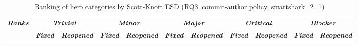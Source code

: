 \begin{table}[htbp]
    \centering
    \scriptsize
    \caption{Ranking of hero categories by Scott-Knott ESD (RQ3, commit-author policy, smartshark\_2\_1)}
    \label{tab:rq3-herorank-commit-author}
    \begin{adjustbox}{max width=\textwidth}
        \begin{tabular}{|c|cc|cc|cc|cc|cc|}
            \hline
            \multirow{2}{*}{\textit{\textbf{Ranks}}} & \multicolumn{2}{c|}{\textit{\textbf{Trivial}}} & \multicolumn{2}{c|}{\textit{\textbf{Minor}}} & \multicolumn{2}{c|}{\textit{\textbf{Major}}} & \multicolumn{2}{c|}{\textit{\textbf{Critical}}} & \multicolumn{2}{c|}{\textit{\textbf{Blocker}}} \\ \cline{2-11}
            & \multicolumn{1}{c|}{\textit{\textbf{Fixed}}} & \textit{\textbf{Reopened}} & \multicolumn{1}{c|}{\textit{\textbf{Fixed}}} & \textit{\textbf{Reopened}} & \multicolumn{1}{c|}{\textit{\textbf{Fixed}}} & \textit{\textbf{Reopened}} & \multicolumn{1}{c|}{\textit{\textbf{Fixed}}} & \textit{\textbf{Reopened}} & \multicolumn{1}{c|}{\textit{\textbf{Fixed}}} & \textit{\textbf{Reopened}} \\ \hline

\end{tabular}
\end{adjustbox}
\end{table}
